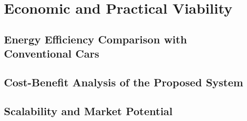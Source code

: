 \section{Economic and Practical Viability}

\subsection{Energy Efficiency Comparison with Conventional Cars}

\subsection{Cost-Benefit Analysis of the Proposed System}

\subsection{Scalability and Market Potential}


